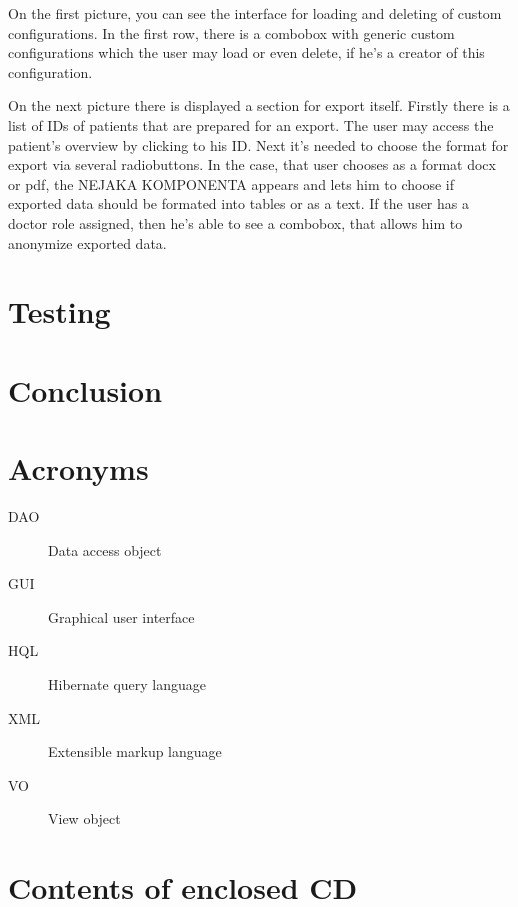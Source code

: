 \documentclass[thesis=B,english]{FITthesis}[2012/10/20]
\begin{document}
On the first picture, you can see the interface for loading and deleting of custom configurations. In the first row, there is a combobox with generic custom configurations which the user may load or even delete, if he's a creator of this configuration.

On the next picture there is displayed a section for export itself. Firstly there is a list of IDs of patients that are prepared for an export. The user may access the patient's overview by clicking to his ID. Next it's needed to choose the format for export via several radiobuttons. In the case, that user chooses as a format docx or pdf, the NEJAKA KOMPONENTA appears and lets him to choose if exported data should be formated into tables or as a text. If the user has a doctor role assigned, then he's able to see a combobox, that allows him to anonymize exported data.

\chapter{Testing}
\chapter{Conclusion}




\appendix

\chapter{Acronyms}
\begin{description}
	\item[DAO] Data access object
	\item[GUI] Graphical user interface
	\item[HQL] Hibernate query language
	\item[XML] Extensible markup language
	\item[VO] View object
\end{description}


\chapter{Contents of enclosed CD}


\begin{figure}
\end{figure}
\end{document}
